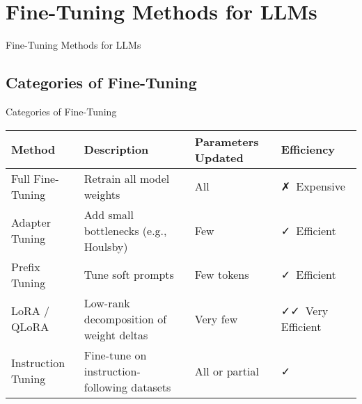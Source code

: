 \section{Fine-Tuning Methods for LLMs}
\begin{frame}{}
    \LARGE Fine-Tuning Methods for LLMs
\end{frame}

\subsection{Categories of Fine-Tuning}
\begin{frame}{Categories of Fine-Tuning}
    \begin{table}[]
        \centering
        \renewcommand{\arraystretch}{1.8}
        \begin{tabular}{@{} p{} p{} p{}  p{} @{}}
            \hline
            \textbf{Method} & \textbf{Description} & \textbf{Parameters Updated} & \textbf{Efficiency} \\
            \hline
            Full Fine-Tuning & Retrain all model weights & All & ✗~Expensive \\
            Adapter Tuning & Add small bottlenecks (e.g., Houlsby) & Few & ✓~Efficient \\
            Prefix Tuning & Tune soft prompts & Few tokens & ✓~Efficient \\
            LoRA / QLoRA & Low-rank decomposition of weight deltas & Very few & ✓✓~Very Efficient \\
            Instruction Tuning & Fine-tune on instruction-following datasets & All or partial & ✓~ \\
            \hline
        \end{tabular}
    \end{table}
\end{frame}


